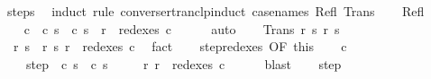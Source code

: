\begin{isabellebody}
%
\isadelimproof
%
\endisadelimproof
%
\isatagproof
{}\isamarkupfalse%
\ steps\ \isanewline
{}\isamarkupfalse%
\ {\isacharparenleft}induct\ rule{\isacharcolon}\ converse{\isacharunderscore}rtranclp{\isacharunderscore}induct{}\ {\isacharbrackleft}case{\isacharunderscore}names\ Refl\ Trans{\isacharbrackright}{\isacharparenright}\isanewline
\ \ \isamarkupfalse%
\ Refl\isanewline
\ \ \isamarkupfalse%
\isanewline
\ \ \isamarkupfalse%
\ {\isachardoublequoteopen}{\isasymexists}c{\isacharprime}{\isachardot}\ {\isasymGamma}{\isasymturnstile}\ {\isacharparenleft}c{\isacharcomma}\ s{\isacharprime}{\isacharparenright}\ {\isasymrightarrow}\isactrlsup {\isacharasterisk}\ {\isacharparenleft}c{\isacharprime}{\isacharcomma}\ s{\isacharprime}{\isacharparenright}\ {\isasymand}\ r{\isacharprime}\ {\isasymin}\ redexes\ c{\isacharprime}{\isachardoublequoteclose}\isanewline
\ \ \ \ \isamarkupfalse%
\ auto\isanewline
{}\isamarkupfalse%
\isanewline
\ \ \isamarkupfalse%
\ {\isacharparenleft}Trans\ r\ s\ r{\isacharprime}{\isacharprime}\ s{\isacharprime}{\isacharprime}{\isacharparenright}\isanewline
\ \ \isamarkupfalse%
\ {\isachardoublequoteopen}{\isasymGamma}{\isasymturnstile}\ {\isacharparenleft}r{\isacharcomma}\ s{\isacharparenright}\ {\isasymrightarrow}\ {\isacharparenleft}r{\isacharprime}{\isacharprime}{\isacharcomma}\ s{\isacharprime}{\isacharprime}{\isacharparenright}{\isachardoublequoteclose}\ {\isachardoublequoteopen}r\ {\isasymin}\ redexes\ c{\isachardoublequoteclose}\ \isamarkupfalse%
\ fact{\isacharplus}\isanewline
\ \ \isamarkupfalse%
\ step{\isacharunderscore}redexes\ {\isacharbrackleft}OF\ this{\isacharbrackright}\isanewline
\ \ \isamarkupfalse%
\ c{\isacharprime}\ \isanewline
\ \ \ \ step{\isacharcolon}\ {\isachardoublequoteopen}{\isasymGamma}{\isasymturnstile}\ {\isacharparenleft}c{\isacharcomma}\ s{\isacharparenright}\ {\isasymrightarrow}\ {\isacharparenleft}c{\isacharprime}{\isacharcomma}\ s{\isacharprime}{\isacharprime}{\isacharparenright}{\isachardoublequoteclose}\ \isanewline
\ \ \ \ r{\isacharprime}{\isacharprime}{\isacharcolon}\ {\isachardoublequoteopen}r{\isacharprime}{\isacharprime}\ {\isasymin}\ redexes\ c{\isacharprime}{\isachardoublequoteclose}\isanewline
\ \ \ \ \isamarkupfalse%
\ blast\isanewline
\ \ \isamarkupfalse%
\ step\isanewline
\ \ \isamarkupfalse%
\isanewline

\end{isabellebody}
